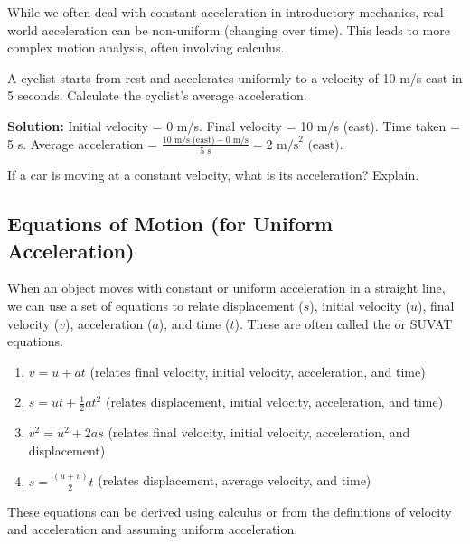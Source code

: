 \begin{marginnote}
  While we often deal with constant acceleration in introductory mechanics, real-world acceleration can be non-uniform (changing over time).  This leads to more complex motion analysis, often involving calculus.
\end{marginnote}

\begin{example}
A cyclist starts from rest and accelerates uniformly to a velocity of 10 m/s east in 5 seconds. Calculate the cyclist's average acceleration.

\textbf{Solution:}
Initial velocity = 0 m/s. Final velocity = 10 m/s (east). Time taken = 5 s.
Average acceleration = $\frac{10 \text{ m/s (east)} - 0 \text{ m/s}}{5 \text{ s}} = 2 \text{ m/s}^2 \text{ (east)}$.
\end{example}

\begin{stopandthink}
If a car is moving at a constant velocity, what is its acceleration? Explain.
\end{stopandthink}

\subsection{Equations of Motion (for Uniform Acceleration)}

When an object moves with constant or uniform acceleration in a straight line, we can use a set of equations to relate displacement ($s$), initial velocity ($u$), final velocity ($v$), acceleration ($a$), and time ($t$). These are often called the  or SUVAT equations.

\begin{enumerate}
    \item $v = u + at$  (relates final velocity, initial velocity, acceleration, and time)
    \item $s = ut + \frac{1}{2}at^2$  (relates displacement, initial velocity, acceleration, and time)
    \item $v^2 = u^2 + 2as$  (relates final velocity, initial velocity, acceleration, and displacement)
    \item $s = \frac{(u+v)}{2}t$ (relates displacement, average velocity, and time)
\end{enumerate}

\begin{marginnote}
 These equations can be derived using calculus or from the definitions of velocity and acceleration and assuming uniform acceleration.
\end{marginnote}

